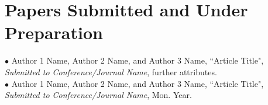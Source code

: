 

\chapter{Papers Submitted and Under Preparation}

$\bullet$ Author 1 Name, Author 2 Name, and Author 3 Name, {``Article Title"}, \emph{Submitted to Conference/Journal Name}, further attributes.
\\
$\bullet$ Author 1 Name, Author 2 Name, and Author 3 Name, {``Article Title"}, \emph{Submitted to Conference/Journal Name}, Mon. Year.

